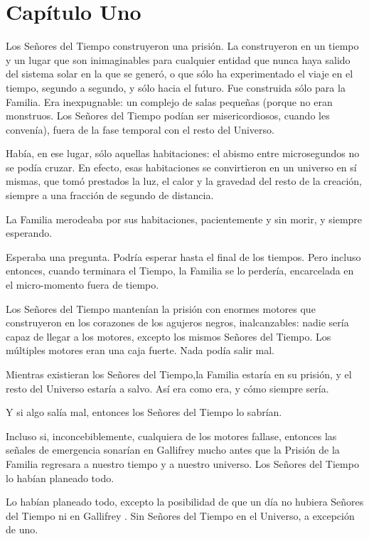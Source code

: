 \chapter*{Capítulo Uno} 

Los Señores del Tiempo construyeron una prisión. La construyeron en un tiempo y un lugar que son inimaginables para cualquier entidad que nunca haya salido del sistema solar en la que se generó, o que sólo ha experimentado el viaje en el tiempo, segundo a segundo, y sólo hacia el futuro. Fue construida sólo para la Familia. Era inexpugnable: un complejo de salas pequeñas (porque no eran monstruos. Los Señores del Tiempo podían ser misericordiosos, cuando les convenía), fuera de la fase temporal con el resto del Universo.

Había, en ese lugar, sólo aquellas habitaciones: el abismo entre microsegundos no se podía cruzar. En efecto, esas habitaciones se convirtieron en un universo en sí mismas, que tomó prestados la luz, el calor y la gravedad del resto de la creación, siempre a una fracción de segundo de distancia.

La Familia merodeaba por sus habitaciones, pacientemente y sin morir, y siempre esperando.

Esperaba una pregunta. Podría esperar hasta el final de los tiempos. Pero incluso entonces, cuando terminara el Tiempo, la Familia se lo perdería, encarcelada en el micro-momento fuera de tiempo.

Los Señores del Tiempo mantenían la prisión con enormes motores que construyeron en los corazones de los agujeros negros, inalcanzables: nadie sería capaz de llegar a los motores, excepto los mismos Señores del Tiempo. Los múltiples motores eran una caja fuerte. Nada podía salir mal.

Mientras existieran los Señores del Tiempo,la Familia estaría en su prisión, y el resto del Universo estaría a salvo. Así era como era, y cómo siempre sería.

Y si algo salía mal, entonces los Señores del Tiempo lo sabrían.

Incluso si, inconcebiblemente, cualquiera de los motores fallase, entonces las señales de emergencia sonarían en Gallifrey mucho antes que la Prisión de la Familia regresara a nuestro tiempo y a nuestro universo. Los Señores del Tiempo lo habían planeado todo.

Lo habían planeado todo, excepto la posibilidad de que un día no hubiera Señores del Tiempo ni en Gallifrey . Sin Señores del Tiempo en el Universo, a excepción de uno.

